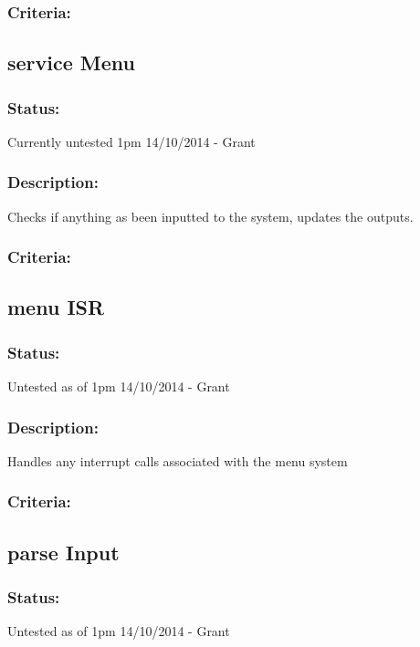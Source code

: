 \documentclass[]{report}
\begin{document}
\subsubsection{Criteria:}

\subsection{service Menu}
\subsubsection{Status:}
Currently untested 1pm 14/10/2014 - Grant

\subsubsection{Description:}
Checks if anything as been inputted to the system, updates the outputs.

\subsubsection{Criteria:}

\subsection{menu ISR}
\subsubsection{Status:}
Untested as of 1pm 14/10/2014 - Grant

\subsubsection{Description:}
Handles any interrupt calls associated with the menu system

\subsubsection{Criteria:}

\subsection{parse Input}
\subsubsection{Status:}
Untested as of 1pm 14/10/2014 - Grant
\end{document}
